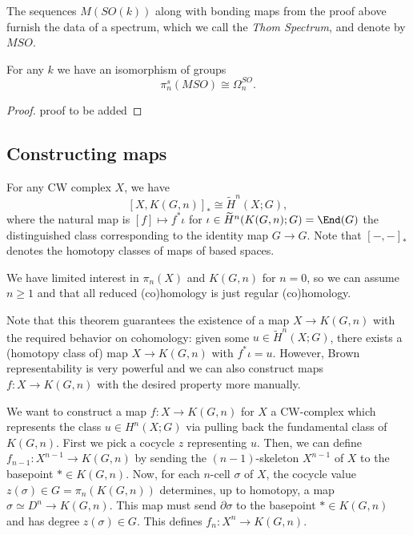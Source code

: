 \begin{corollary}
    The sequences $M(SO(k))$ along with bonding maps from the proof above furnish the data of a spectrum, which we call the \textit{Thom Spectrum}, and denote by $MSO$.
\end{corollary}

\begin{theorem}
For any $k$ we have an isomorphism of groups
    \[\pi_n^s(MSO)\cong\Omega^{SO}_n.\]
\end{theorem}
\begin{proof}
    proof to be added
\end{proof}

\subsection{Constructing maps}
\begin{theorem}
    For any CW complex $X$, we have
    \[[X,K(G,n)]_*\cong \widetilde H^n(X;G),\]
    where the natural map is $[f]\mapsto f^*\iota$ for $\iota\in \widetilde H^n(K(G,n);G)=\End(G)$ the distinguished class corresponding to the identity map $G\to G$. Note that $[-,-]_*$ denotes the homotopy classes of maps of based spaces.
\end{theorem}
\begin{remark}
    We have limited interest in $\pi_n(X)$ and $K(G,n)$ for $n=0$, so we can assume $n\geq 1$ and that all reduced (co)homology is just regular (co)homology.
\end{remark}

Note that this theorem guarantees the existence of a map $X\to K(G,n)$ with the required behavior on cohomology: given some $u\in \widetilde H^n(X;G)$, there exists a (homotopy class of) map $X\to K(G,n)$ with $f^*\iota=u$. However, Brown representability is very powerful and we can also construct maps $f:X\to K(G,n)$ with the desired property more manually. 


We want to construct a map $f:X\to K(G,n)$ for $X$ a CW-complex which represents the class $u\in H^n(X;G)$ via pulling back the fundamental class of $K(G,n)$. First we pick a cocycle $z$ representing $u$. Then,  we can define $f_{n-1}:X^{n-1}\to K(G,n)$ by sending the $(n-1)$-skeleton $X^{n-1}$ of $X$ to the basepoint $*\in K(G,n)$. Now, for each $n$-cell $\sigma$ of $X$, the cocycle value $z(\sigma)\in G=\pi_n(K(G,n))$ determines, up to homotopy, a map $\sigma\simeq D^n\to K(G,n)$. This map must send $\partial \sigma$ to the basepoint $*\in K(G,n)$ and has degree $z(\sigma)\in G$. This defines $f_n:X^n\to K(G,n)$.  

